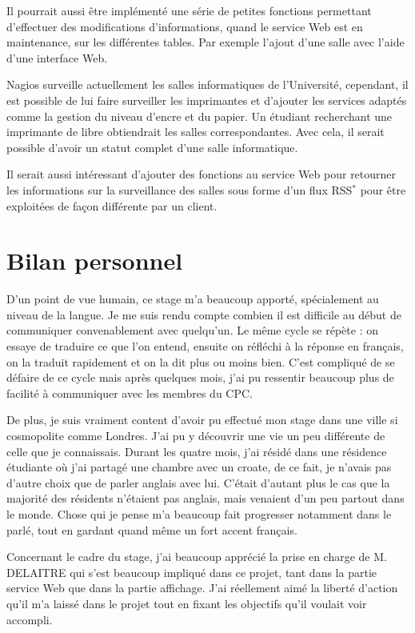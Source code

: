 Il pourrait aussi \^etre impl\'ement\'e une s\'erie de petites fonctions permettant d'effectuer des modifications d'informations, quand le service Web est en maintenance, sur les diff\'erentes tables.
Par exemple l'ajout d'une salle avec l'aide d'une interface Web.

Nagios surveille actuellement les salles informatiques de l'Universit\'e, cependant, il est possible de lui faire surveiller les imprimantes et d'ajouter les services adapt\'es comme la gestion du niveau d'encre et du papier.
Un \'etudiant recherchant une imprimante de libre obtiendrait les salles correspondantes.
Avec cela, il serait possible d'avoir un statut complet d'une salle informatique.

Il serait aussi int\'eressant d'ajouter des fonctions au service Web pour retourner les informations sur la surveillance des salles sous forme d'un flux RSS$^*$ pour \^etre exploit\'ees de fa\c{c}on diff\'erente par un client.


\section{Bilan personnel}

D'un point de vue humain, ce stage m'a beaucoup apport\'e, sp\'ecialement au niveau de la langue.
Je me suis rendu compte combien il est difficile au d\'ebut de communiquer convenablement avec quelqu'un.
Le m\^eme cycle se r\'ep\`ete : on essaye de traduire ce que l'on entend, ensuite on r\'efl\'echi \`a la r\'eponse en fran\c{c}ais, on la traduit rapidement et on la dit plus ou moins bien.
C'est compliqu\'e de se d\'efaire de ce cycle mais apr\`es quelques mois, j'ai pu ressentir beaucoup plus de facilit\'e \`a communiquer avec les membres du CPC.

De plus, je suis vraiment content d'avoir pu effectu\'e mon stage dans une ville si cosmopolite comme Londres.
J'ai pu y d\'ecouvrir une vie un peu diff\'erente de celle que je connaissais.
Durant les quatre mois, j'ai r\'esid\'e dans une r\'esidence \'etudiante o\`u j'ai partag\'e une chambre avec un croate, de ce fait, je n'avais pas d'autre choix que de parler anglais avec lui.
C'\'etait d'autant plus le cas que la majorit\'e des r\'esidents n'\'etaient pas anglais, mais venaient d'un peu partout dans le monde.
Chose qui je pense m'a beaucoup fait progresser notamment dans le parl\'e, tout en gardant quand m\^eme un fort accent fran\c{c}ais.

Concernant le cadre du stage, j'ai beaucoup appr\'eci\'e la prise en charge de M. DELAITRE qui s'est beaucoup impliqu\'e dans ce projet, tant dans la partie service Web que dans la partie affichage.
J'ai r\'eellement aim\'e la libert\'e d'action qu'il m'a laiss\'e dans le projet tout en fixant les objectifs qu'il voulait voir accompli.

